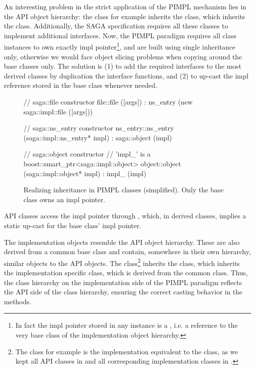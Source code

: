 An interesting problem in the strict application of the PIMPL
mechanism lies in the API object hierarchy:  the  class
for example inherits the  class, which inherits the
 class.  Additionally, the SAGA specification requires
all these classes to implement additional interfaces.  Now, the PIMPL
paradigm requires all class instances to own exactly  impl
pointer\footnote{\small{In fact the impl pointer stored in any 
instance is a , i.e. a reference
to the very base class of the implementation object hierarchy.}}, and are 
built using single inheritance only, otherwise we would face object slicing 
problems when copying around the base classes only. The solution is (1) to
add the required interfaces to the most derived classes by duplication
the interface functions, and (2) to up-cast the impl reference stored in the
base class whenever needed.

\begin{figure}[!ht]
 \begin{center}
  \begin{mycode}[label=Constructors in the saga::file hierarchy]
  // saga::file constructor
  file::file ([args])
  :  ns_entry (new saga::impl::file ([args]))  {}
  
  // saga::ns_entry constructor
  ns_entry::ns_entry (saga::impl::ns_entry* impl)
  :  saga::object (impl) {}
  
  // saga::object constructor
  //  'impl_' is a boost::smart_ptr<saga::impl::object>
  object::object (saga::impl::object* impl)
  :  impl_ (impl) {}
  \end{mycode}
  \up
  \up
  \caption{\label{src:implcon}
    Realizing inheritance in PIMPL classes (simplified).  Only the
     base class owns an impl pointer.}
 \end{center}
\end{figure}

API classes access the impl pointer through , which, in
derived classes, implies a static up-cast for the base class' impl
pointer.  

The implementation objects resemble the API object hierarchy.  These
are also derived from a common base class and contain, somewhere in
their own hierarchy, similar objects to the API objects.  The
 class\footnote{\small{The 
class for example is the implementation equivalent to the
 class, as we kept all API classes in 
and all corresponding implementation classes in
.}} inherits the 
class, which inherits the implementation specific
 class, which is derived from the common
 class.  Thus, the class hierarchy on the
implementation side of the PIMPL paradigm reflects the API side of the
class hierarchy, ensuring the correct casting behavior in the
 methods.


